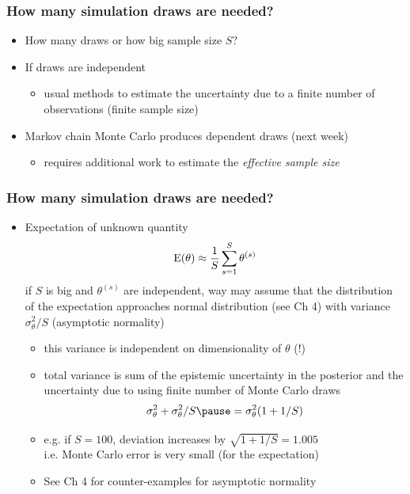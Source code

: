 \documentclass[10pt]{beamer}
\begin{document}
\begin{frame}


\frametitle{How many simulation draws are needed?}

  \begin{itemize}
  \item How many draws or how big sample size $S$?
  \item If draws are independent
    \begin{itemize}
    \item usual methods to estimate the uncertainty due to a finite
      number of observations (finite sample size)
    \end{itemize}
  \item Markov chain Monte Carlo produces dependent draws (next week)
    \begin{itemize}
    \item requires additional work to estimate the \emph{effective
        sample size}
    \end{itemize}
  \end{itemize}

\end{frame}

\begin{frame}

\frametitle{How many simulation draws are needed?}

  \begin{itemize}
  \item Expectation of unknown quantity
    \begin{equation*}
      \mathrm{E}(\theta)\approx \frac{1}{S}\sum_{s=1}^S \theta^{(s)}
    \end{equation*}
    if $S$ is big and $\theta^{(s)}$ are independent, way may assume
    that the distribution of the expectation approaches normal
    distribution (see Ch 4) with variance $\sigma^2_\theta/S$
    (asymptotic normality)
    \begin{itemize}
    \item this variance is independent on dimensionality of $\theta$ (!)
      \pause
    \item total variance is sum of the epistemic uncertainty in the
      posterior and the uncertainty due to using finite number of
      Monte Carlo draws
      \begin{equation*}
        \sigma^2_\theta+\sigma^2_\theta/S \pause= \sigma^2_\theta(1+1/S)
      \end{equation*}
      \pause
      \vspace{-5mm}
    \item e.g. if $S=100$, deviation increases by $\sqrt{1+1/S}=1.005$\\
      i.e. Monte Carlo error is very small (for the expectation)
      \pause
    \item See Ch 4 for counter-examples for asymptotic normality
    \end{itemize}
\end{itemize}

\end{frame}
\end{document}
